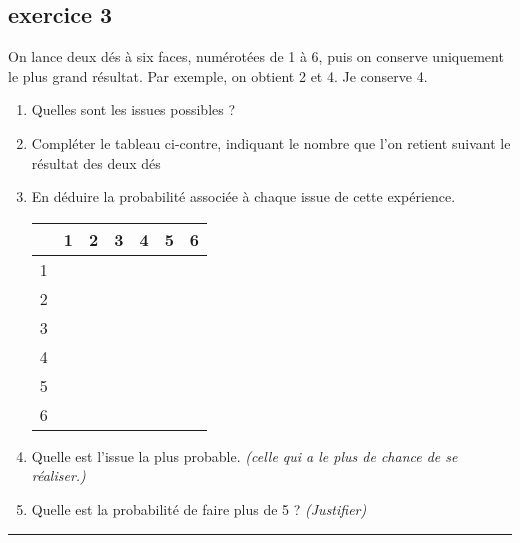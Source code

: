 \documentclass[11pt]{article}
\newcommand{\horrule}[1]{\rule{\linewidth}{#1}} %
\begin{document}
\begin{multicols}{2}
  \subsection*{exercice 3}

  On lance deux dés à six faces, numérotées de 1 à 6, puis on conserve uniquement le plus grand résultat. Par exemple, on obtient 2 et 4. Je conserve 4.

  \begin{enumerate}
  \item Quelles sont les issues possibles ?
  \item Compléter le tableau ci-contre, indiquant le nombre que l’on retient suivant le résultat des deux dés
  \item En déduire la probabilité associée à chaque issue de cette expérience. 
    \begin{center}
      \begin{tabular}{|c|c|c|c|c|c|c|}
        \hline
        & 1 & 2 & 3 & 4 & 5 & 6 \\
        \hline
        1 &   &   &   &   &   &\\  
        \hline
        2 &   &   &   &   &   &\\  
        \hline
        3 &   &   &   &   &   &\\  
        \hline
        4 &   &   &   &   &   &\\  
        \hline
        5 &   &   &   &   &   &\\  
        \hline
        6 &   &   &   &   &   &\\
        \hline     
      \end{tabular}
    \end{center}
  \item Quelle est l'issue la plus probable. \textit{(celle qui a le plus de chance de se réaliser.)}
  \item Quelle est la probabilité de faire plus de 5 ?  \textit{(Justifier)}
  \end{enumerate}
\end{multicols}

\vspace{-0.4cm}
\horrule{1px}
\vspace{-0.8cm}
\end{document}
